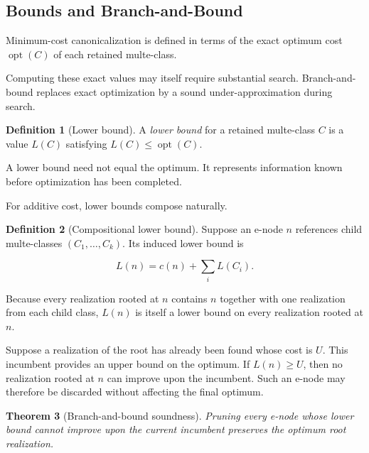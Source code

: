 \documentclass[sigconf,nonacm]{acmart}
\theoremstyle{definition}
\newtheorem{definition}{Definition}[section]
\theoremstyle{plain}
\newtheorem{theorem}[definition]{Theorem}
\theoremstyle{remark}
\begin{document}
\subsection{Bounds and Branch-and-Bound}
\label{sec:bounds-pruning}

Minimum-cost canonicalization is defined in terms of the exact
optimum cost \(\operatorname{opt}(C)\) of each retained multe-class.

Computing these exact values may itself require substantial search.
Branch-and-bound replaces exact optimization by a sound
under-approximation during search.

\begin{definition}[Lower bound]
A \emph{lower bound} for a retained multe-class \(C\) is a value
\(L(C)\) satisfying \(L(C)\le \operatorname{opt}(C)\).
\end{definition}

A lower bound need not equal the optimum.
It represents information known before optimization has been completed.

For additive cost, lower bounds compose naturally.

\begin{definition}[Compositional lower bound]
Suppose an e-node \(n\) references child multe-classes
\((C_1,\ldots,C_k)\).  Its induced lower bound is

\[
L(n)
=
c(n)
+
\sum_i
L(C_i).
\]
\end{definition}

Because every realization rooted at \(n\) contains \(n\) together
with one realization from each child class, \(L(n)\) is itself a
lower bound on every realization rooted at \(n\).

Suppose a realization of the root has already been found whose cost
is \(U\).  This incumbent provides an upper bound on the optimum.
If \(L(n)\ge U\), then no realization rooted at \(n\) can improve
upon the incumbent.  Such an e-node may therefore be discarded
without affecting the final optimum.

\begin{theorem}[Branch-and-bound soundness]

Pruning every e-node whose lower bound cannot improve upon the current
incumbent preserves the optimum root realization.

\end{theorem}
\end{document}
